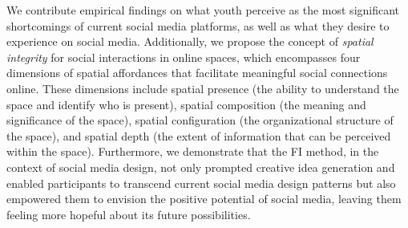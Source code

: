 We contribute empirical findings on what youth perceive as the most significant shortcomings of current social media platforms, as well as what they desire to experience on social media. Additionally, we propose the concept of \textit{spatial integrity} for social interactions in online spaces, which encompasses four dimensions of spatial affordances that facilitate meaningful social connections online. These dimensions include spatial presence (the ability to understand the space and identify who is present), spatial composition (the meaning and significance of the space), spatial configuration (the organizational structure of the space), and spatial depth (the extent of information that can be perceived within the space). Furthermore, we demonstrate that the FI method, in the context of social media design, not only prompted creative idea generation and enabled participants to transcend current social media design patterns but also empowered them to envision the positive potential of social media, leaving them feeling more hopeful about its future possibilities.
